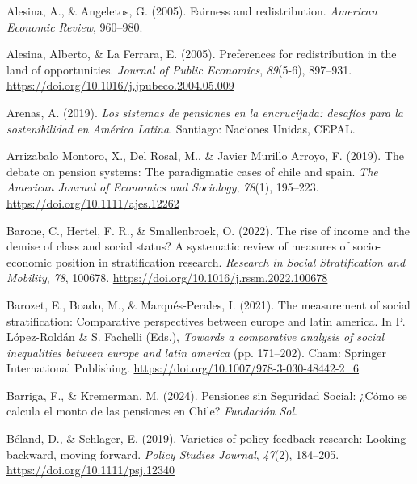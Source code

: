 \documentclass[
  12pt,
]{article}
\newlength{\cslhangindent}
\newenvironment{CSLReferences}[2] %
 {\begin{list}{}{%
  \setlength{\itemindent}{0pt}
  \setlength{\leftmargin}{0pt}
  \setlength{\parsep}{0pt}
  \ifodd #1
   \setlength{\leftmargin}{\cslhangindent}
   \setlength{\itemindent}{-1\cslhangindent}
  \fi
  \setlength{\itemsep}{#2\baselineskip}}}
 {\end{list}}
\begin{document}
\label{refs}
\begin{CSLReferences}{1}{0}
Alesina, A., \& Angeletos, G. (2005). Fairness and redistribution.
\emph{American Economic Review}, 960--980.

Alesina, Alberto, \& La Ferrara, E. (2005). Preferences for
redistribution in the land of opportunities. \emph{Journal of Public
Economics}, \emph{89}(5-6), 897--931.
\url{https://doi.org/10.1016/j.jpubeco.2004.05.009}

Arenas, A. (2019). \emph{Los sistemas de pensiones en la encrucijada:
desafíos para la sostenibilidad en América Latina}. Santiago: Naciones
Unidas, CEPAL.

Arrizabalo Montoro, X., Del Rosal, M., \& Javier Murillo Arroyo, F.
(2019). The debate on pension systems: The paradigmatic cases of chile
and spain. \emph{The American Journal of Economics and Sociology},
\emph{78}(1), 195--223. \url{https://doi.org/10.1111/ajes.12262}

Barone, C., Hertel, F. R., \& Smallenbroek, O. (2022). The rise of
income and the demise of class and social status? A systematic review of
measures of socio-economic position in stratification research.
\emph{Research in Social Stratification and Mobility}, \emph{78},
100678. \url{https://doi.org/10.1016/j.rssm.2022.100678}

Barozet, E., Boado, M., \& Marqués-Perales, I. (2021). The measurement
of social stratification: Comparative perspectives between europe and
latin america. In P. López-Roldán \& S. Fachelli (Eds.), \emph{Towards a
comparative analysis of social inequalities between europe and latin
america} (pp. 171--202). Cham: Springer International Publishing.
\url{https://doi.org/10.1007/978-3-030-48442-2_6}

Barriga, F., \& Kremerman, M. (2024). Pensiones sin Seguridad Social:
¿Cómo se calcula el monto de las pensiones en Chile? \emph{Fundación
Sol}.

Béland, D., \& Schlager, E. (2019). Varieties of policy feedback
research: Looking backward, moving forward. \emph{Policy Studies
Journal}, \emph{47}(2), 184--205.
\url{https://doi.org/10.1111/psj.12340}


\end{CSLReferences}
\end{document}

